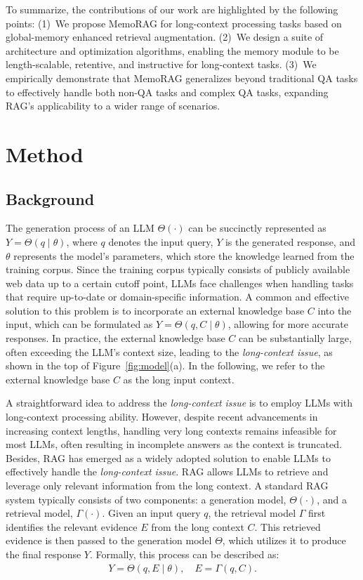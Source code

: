 \documentclass[sigconf]{acmart}
\begin{document}
To summarize, the contributions of our work are highlighted by the following points: (1)~We propose MemoRAG for long-context processing tasks based on global-memory enhanced retrieval augmentation. (2)~We design a suite of architecture and optimization algorithms, enabling the memory module to be length-scalable, retentive, and instructive for long-context tasks. (3)~We empirically demonstrate that MemoRAG generalizes beyond traditional QA tasks to effectively handle both non-QA tasks and complex QA tasks, expanding RAG’s applicability to a wider range of scenarios.


\section{Method}

\subsection{Background}
The generation process of an LLM $\Theta(\cdot)$ can be succinctly represented as $Y = \Theta(q \mid \theta)$, where $q$ denotes the input query, $Y$ is the generated response, and $\theta$ represents the model's parameters, which store the knowledge learned from the training corpus. Since the training corpus typically consists of publicly available web data up to a certain cutoff point, LLMs face challenges when handling tasks that require up-to-date or domain-specific information. A common and effective solution to this problem is to incorporate an external knowledge base $C$ into the input, which can be formulated as $Y = \Theta(q, C \mid \theta)$, allowing for more accurate responses. In practice, the external knowledge base $C$ can be substantially large, often exceeding the LLM's context size, leading to the \textit{long-context issue}, as shown in the top of Figure~\ref{fig:model}(a). In the following, we refer to the external knowledge base $C$ as the long input context.

A straightforward idea to address the \textit{long-context issue} is to employ LLMs with long-context processing ability. However, despite recent advancements in increasing context lengths, handling very long contexts remains infeasible for most LLMs, often resulting in incomplete answers as the context is truncated. 
Besides, RAG has emerged as a widely adopted solution to enable LLMs to effectively handle the \textit{long-context issue}. RAG allows LLMs to retrieve and leverage only relevant information from the long context. A standard RAG system typically consists of two components: a generation model, $\Theta(\cdot)$, and a retrieval model, $\Gamma(\cdot)$. Given an input query $q$, the retrieval model $\Gamma$ first identifies the relevant evidence $E$ from the long context $C$. This retrieved evidence is then passed to the generation model $\Theta$, which utilizes it to produce the final response $Y$. Formally, this process can be described as:
\begin{align}
Y = \Theta(q, E \mid \theta), \quad E = \Gamma(q, C).
\end{align}
\end{document}
